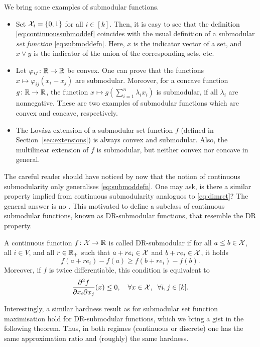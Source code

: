 We bring some examples of submodular functions.
\begin{itemize}
    \item Set $\mathcal{X}_i = \{0 ,1\}$ for all $i \in [k]$. Then, it is easy to see that the definition \eqref{eq:continuoussubmoddef} coincides with the usual definition of a submodular \emph{set function} \eqref{eq:submoddefn}. Here, $x$ is the indicator vector of a set, and $x\vee y$ is the indicator of the union of the corresponding sets, etc.

    \item Let $\varphi_{ij}\colon \mathbb{R}\to\mathbb{R}$ be convex. One can prove that the functions $x\mapsto \varphi_{ij}(x_i - x_j)$ are submodular. Moreover, for a concave function $g\colon\mathbb{R}\to\mathbb{R}$, the function $x\mapsto g(\sum_{i=1}^n \lambda_ix_i)$ is submodular, if all $\lambda_i$ are nonnegative. These are two examples of submodular functions which are convex and concave, respectively.

    \item The Lov\'asz extension of a submodular set function $f$ (defined in Section~\ref{sec:extensions}) is always convex and submodular. Also, the multilinear extension of $f$ is submodular, but neither convex nor concave in general.
\end{itemize}

The careful reader should have noticed by now that the notion of continuous submodularity only generalises \eqref{eq:submoddefn}. One may ask, is there a similar property implied from continuous submodularity analoguos to \eqref{eq:dimret}? The general answer is no \citep{soma2014optimal}. This motivated \citet{bian2016guaranteed} to define a subclass of continuous submodular functions, known as DR-submodular functions, that resemble the DR property. 

\begin{definition}\label{def:dr}
    A continuous function $f\colon \mathcal{X} \to \mathbb{R}$ is called DR-submodular if for all $a\leq b \in \mathcal{X}$, all $i\in V$, and all $r\in\mathbb{R}_+$ such that $a + re_i \in \mathcal{X}$ and $b+re_i\in\mathcal{X}$, it holds
    \[
        f(a + re_i) - f(a) \geq f(b + re_i) - f(b).
    \]
    Moreover, if $f$ is twice differentiable, this condition is equivalent to 
    \[
        \frac{\partial^2 f}{\partial x_i \partial x_j}(x) \leq 0,\quad \forall x\in\mathcal{X}, \;\;\forall i,j \in [k].
    \]
\end{definition}

Interestingly, a similar hardness result as for submodular set function maximisation hold for DR-submodular functions, which we bring a gist in the following theorem. Thus, in both regimes (continuous or discrete) one has the same approximation ratio and (roughly) the same hardness. 

